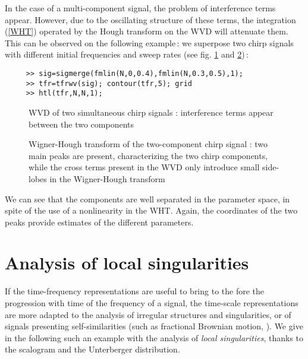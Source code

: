   In the case of a multi-component signal, the problem of interference
terms appear. However, due to the oscillating structure of these terms, the
integration (\ref{WHT}) operated by the Hough transform on the WVD will
attenuate them. This can be observed on the following example\,: we
superpose two chirp signals with different initial frequencies and sweep
rates (see fig. \ref{Ex1fig5} and \ref{Ex1fig6})\,:
\begin{verbatim}
     >> sig=sigmerge(fmlin(N,0,0.4),fmlin(N,0.3,0.5),1);
     >> tfr=tfrwv(sig); contour(tfr,5); grid
     >> htl(tfr,N,N,1);
\end{verbatim}
\begin{figure}[htb]
\epsfxsize=10cm
\epsfysize=10cm
\centerline{}
\caption{\label{Ex1fig5}WVD of two simultaneous chirp signals :
interference terms appear between the two components}
\end{figure}
\begin{figure}[htb]
\epsfxsize=10cm
\epsfysize=8cm
\centerline{}
\caption{\label{Ex1fig6}Wigner-Hough transform of the two-component chirp
signal : two main peaks are present, characterizing the two chirp
components, while the cross terms present in the WVD only introduce small
side-lobes in the Wigner-Hough transform}
\end{figure}
We can see that the components are well separated in the parameter
space, in spite of the use of a nonlinearity in the WHT. Again, the
coordinates of the two peaks provide estimates of the different
parameters. 


\section{Analysis of local singularities}
 If the
time-frequency representations are useful to bring to the fore the
progression with time of the frequency of a signal, the time-scale
representations are more adapted to the analysis of irregular structures
and singularities, or of signals presenting self-similarities (such as
fractional Brownian motion, \cite{GON92}). We give in the following such an
example with the analysis of {\it local singularities}, thanks to the
scalogram and the Unterberger distribution.

